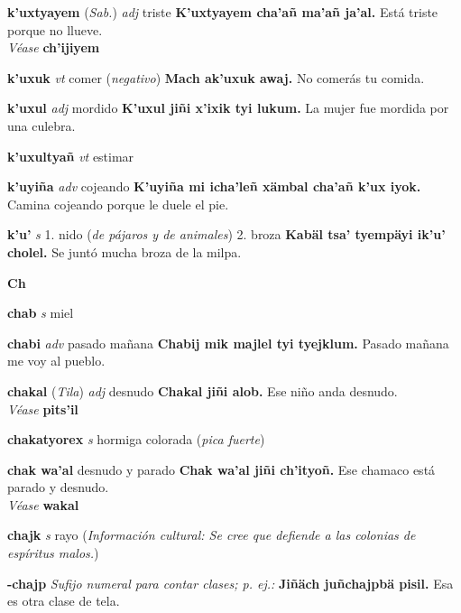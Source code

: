 \documentclass[10pt]{scrbook}
\newcommand{\entry}[1]{\textbf{#1}}
\newcommand{\alphaletter}[1]{\end{multicols}\addsec{#1}\begin{multicols}{2}}
\newcommand{\onedefinition}[1]{#1.}
\newcommand{\nontranslationdef}[1]{\textit{#1}}
\newcommand{\partofspeech}[1]{\textit{#1}}
\newcommand{\spanishtranslation}[1]{#1}
\newcommand{\clarification}[1]{(\textit{#1})}
\newcommand{\cholexample}[1]{\textbf{#1}}
\newcommand{\exampletranslation}[1]{#1}
\newcommand{\alsosee}[1]{\\\textit{Véase} \textbf{#1}}
\newcommand{\relevantdialect}[1]{(\textit{#1})}
\newcommand{\culturalinformation}[1]{(\textit{#1})}
\begin{document}
\begin{multicols}{2}
\entry{k'uxtyayem}
\relevantdialect{Sab.}
\partofspeech{adj}
\spanishtranslation{triste}
\cholexample{K'uxtyayem cha'añ ma'añ ja'al.}
\exampletranslation{Está triste porque no llueve.}
\alsosee{ch'ijiyem}

\entry{k'uxuk}
\partofspeech{vt}
\spanishtranslation{comer}
\clarification{negativo}
\cholexample{Mach ak'uxuk awaj.}
\exampletranslation{No comerás tu comida.}

\entry{k'uxul}
\partofspeech{adj}
\spanishtranslation{mordido}
\cholexample{K'uxul jiñi x'ixik tyi lukum.}
\exampletranslation{La mujer fue mordida por una culebra.}

\entry{k'uxultyañ}
\partofspeech{vt}
\spanishtranslation{estimar}

\entry{k'uyiña}
\partofspeech{adv}
\spanishtranslation{cojeando}
\cholexample{K'uyiña mi icha'leñ xämbal cha'añ k'ux iyok.}
\exampletranslation{Camina cojeando porque le duele el pie.}

\entry{k'u'}
\partofspeech{s}
\onedefinition{1}
\spanishtranslation{nido}
\clarification{de pájaros y de animales}
\onedefinition{2}
\spanishtranslation{broza}
\cholexample{Kabäl tsa' tyempäyi ik'u' cholel.}
\exampletranslation{Se juntó mucha broza de la milpa.}

\entry{Ch}
\alphaletter{Ch}

\entry{chab}
\partofspeech{s}
\spanishtranslation{miel}

\entry{chabi}
\partofspeech{adv}
\spanishtranslation{pasado mañana}
\cholexample{Chabij mik majlel tyi tyejklum.}
\exampletranslation{Pasado mañana me voy al pueblo.}

\entry{chakal}
\relevantdialect{Tila}
\partofspeech{adj}
\spanishtranslation{desnudo}
\cholexample{Chakal jiñi alob.}
\exampletranslation{Ese niño anda desnudo.}
\alsosee{pits'il}

\entry{chakatyorex}
\partofspeech{s}
\spanishtranslation{hormiga colorada}
\clarification{pica fuerte}

\entry{chak wa'al}
\spanishtranslation{desnudo y parado}
\cholexample{Chak wa'al jiñi ch'ityoñ.}
\exampletranslation{Ese chamaco está parado y desnudo.}
\alsosee{wakal}

\entry{chajk}
\partofspeech{s}
\spanishtranslation{rayo}
\culturalinformation{Información cultural: Se cree que defiende a las colonias de espíritus malos.}

\entry{-chajp}
\nontranslationdef{Sufijo numeral para contar clases; p. ej.:}
\cholexample{Jiñäch juñchajpbä pisil.}
\exampletranslation{Esa es otra clase de tela.}


\end{multicols}
\end{document}

